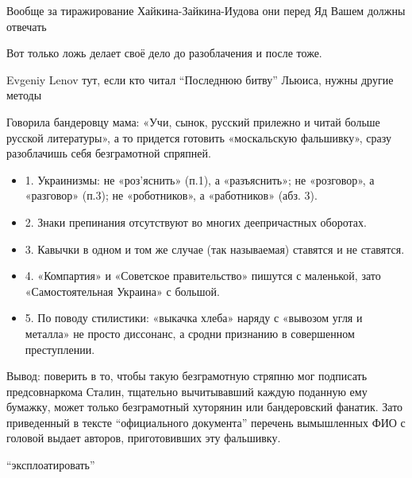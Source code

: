 \begin{itemize}

Вообще за тиражирование Хайкина-Зайкина-Иудова они перед Яд Вашем должны отвечать


Вот только ложь делает своё дело до разоблачения и после тоже.


Evgeniy Lenov тут, если кто читал \enquote{Последнюю битву} Льюиса, нужны другие методы


Говорила бандеровцу мама: «Учи, сынок, русский прилежно и читай больше русской
литературы», а то придется готовить «москальскую фальшивку», сразу разоблачишь
себя безграмотной спряпней.

\begin{itemize}
\item 1. Украинизмы: не «роз'яснить» (п.1), а «разъяснить»; не «розговор», а «разговор» (п.3); не «роботников», а «работников» (абз. 3).
\item 2. Знаки препинания отсутствуют во многих деепричастных оборотах.
\item 3. Кавычки в одном и том же случае (так называемая) ставятся и не ставятся.
\item 4. «Компартия» и «Советское правительство» пишутся с маленькой, зато «Самостоятельная Украина» с большой.
\item 5. По поводу стилистики: «выкачка хлеба» наряду с «вывозом угля и металла» не просто диссонанс, а сродни признанию в совершенном преступлении.
\end{itemize}

Вывод: поверить в то, чтобы такую безграмотную стряпню мог подписать
предсовнаркома Сталин, тщательно вычитывавший каждую поданную ему бумажку,
может только безграмотный хуторянин или бандеровский фанатик. Зато приведенный
в тексте \enquote{официального документа} перечень вымышленных ФИО с головой выдает
авторов, приготовивших эту фальшивку.


\enquote{эксплоатировать}

\end{itemize}
